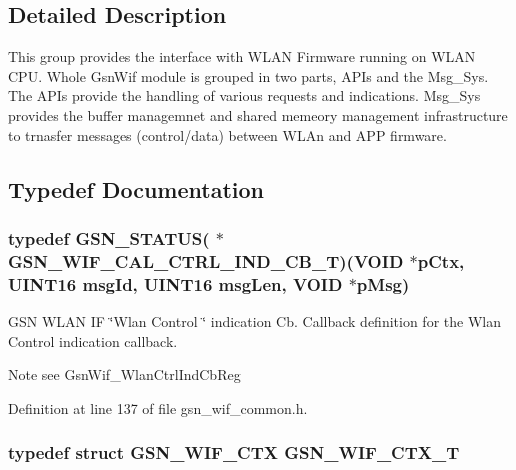 \subsection{Detailed Description}
This group provides the interface with WLAN Firmware running on WLAN CPU. Whole GsnWif module is grouped in two parts, APIs and the Msg\_\-Sys. The APIs provide the handling of various requests and indications. Msg\_\-Sys provides the buffer managemnet and shared memeory management infrastructure to trnasfer messages (control/data) between WLAn and APP firmware. 

\subsection{Typedef Documentation}
\hypertarget{a00635_ga713dea098107eba190695d6e868ff027}{
\subsubsection[{GSN\_\-WIF\_\-CAL\_\-CTRL\_\-IND\_\-CB\_\-T}]{\setlength{\rightskip}{0pt plus 5cm}typedef {\bf GSN\_\-STATUS}( $\ast$ {\bf GSN\_\-WIF\_\-CAL\_\-CTRL\_\-IND\_\-CB\_\-T})(VOID $\ast$pCtx, {\bf UINT16} msgId, {\bf UINT16} msgLen, VOID $\ast$pMsg)}}
\label{a00635_ga713dea098107eba190695d6e868ff027}


GSN WLAN IF \char`\"{}Wlan Control \char`\"{} indication Cb. Callback definition for the Wlan Control indication callback. 

\begin{DoxyNote}{Note}
see GsnWif\_\-WlanCtrlIndCbReg 
\end{DoxyNote}


Definition at line 137 of file gsn\_\-wif\_\-common.h.

\hypertarget{a00635_ga7a8bd94a4326b0ff61696008eda89228}{
\subsubsection[{GSN\_\-WIF\_\-CTX\_\-T}]{\setlength{\rightskip}{0pt plus 5cm}typedef struct {\bf GSN\_\-WIF\_\-CTX} {\bf GSN\_\-WIF\_\-CTX\_\-T}}}
\label{a00635_ga7a8bd94a4326b0ff61696008eda89228}


